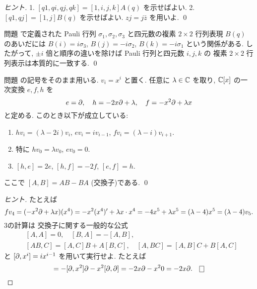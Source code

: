 \documentclass[12pt,twoside]{jarticle}
\begin{document}
\begin{proof}[ヒント]
  1. $[q1,qi,qj,qk]=[1,i,j,k]A(q)$ を示せばよい.
  2. $[q1,qj]=[1,j]B(q)$ を示せばよい. $zj=j\bar{z}$ を用いよ.
  \qed
\end{proof}

\begin{guide}
  問題  で定義された Pauli 行列 $\sigma_1,\sigma_2,\sigma_3$ 
  と四元数の複素 $2\times 2$ 行列表現 $B(q)$ のあいだには %
  $B(i)=i\sigma_3$, $B(j)=-i\sigma_2$, $B(k)=-i\sigma_1$ という関係がある.
  したがって, $\pm i$ 倍と順序の違いを除けば Pauli 行列と四元数 $i,j,k$ の
  複素 $2\times 2$ 行列表示は本質的に一致する.
  \qed
\end{guide}


\begin{question}
  \label{q:sl2-1}
  問題  の記号をそのまま用いる.
  $v_i = x^i$ と置く.
  任意に $\lambda\in{\mathbb C}$ を取り,
  ${\mathbb C}[x]$ の一次変換 $e,f,h$ を
  \begin{equation*}
    e = \partial, \quad
    h = -2x\partial+\lambda, \quad
    f = -x^2\partial+\lambda x
  \end{equation*}
  と定める. このとき以下が成立している:
  \begin{enumerate}
  \item   $hv_i = (\lambda - 2i)v_i$, 
    \quad $ev_i = i v_{i-1}$, 
    \quad $fv_i = (\lambda - i)v_{i+1}$.
  \item 特に \quad $hv_0=\lambda v_0$, \quad $ev_0=0$.
  \item $[h,e]=2e$, \quad $[h,f]=-2f$, \quad $[e,f]=h$.
  \end{enumerate}
  ここで $[A,B] = AB-BA$ (交換子)である. \qed
\end{question}

\begin{proof}[ヒント]
  たとえば 
  \begin{equation*}
    fv_4 
    = (-x^2\partial+\lambda x)(x^4)
    = -x^2(x^4)' + \lambda x\cdot x^4
    = -4x^5+\lambda x^5 
    = (\lambda - 4)x^5
    = (\lambda - 4)v_5.
  \end{equation*}
  3の計算は
  交換子に関する一般的な公式 
  \begin{align*}
    &
    [A,A]=0, \quad [B,A]=-[A,B],
    \\ &
    [AB,C]=[A,C]B+A[B,C], \quad [A,BC]=[A,B]C+B[A,C]
  \end{align*}
  と $[\partial,x^i]=ix^{i-1}$ を用いて実行せよ. たとえば
  \begin{equation*}
    [\d, -x^2\d] = -[\d,x^2]\d -x^2[\d,\d] = -2x\d -x^2 0 = -2x\d.
    \qed
  \end{equation*}
\end{proof}
\end{document}
